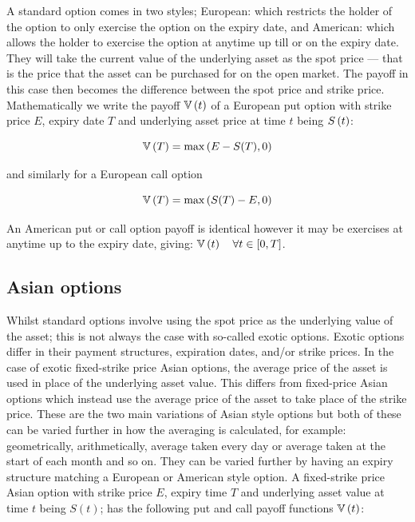 A standard option comes in two styles; European: which restricts the holder of the option to only exercise the option on the expiry date, and American: which allows the holder to exercise the option at anytime up till or on the expiry date. They will take the current value of the underlying asset as the spot price --- that is the price that the asset can be purchased for on the open market. The payoff in this case then becomes the difference between the spot price and strike price.
\nline{}
Mathematically we write the payoff \(\mathbb{V}\left(t\right)\) of a European put option with strike price \(E\), expiry date \(T\) and underlying asset price at time \(t\) being \(S\left(t\right)\):

\begin{equation*}
    \mathbb{V}\left(T\right) = \max\left(E-S(T),0\right) 
\end{equation*}

and similarly for a European call option

\begin{equation*}
    \mathbb{V}\left(T\right) = \max\left(S(T)-E,0\right)
\end{equation*}

An American put or call option payoff is identical however it may be exercises at anytime up to the expiry date, giving: \(\mathbb{V}\left(t\right) \quad \forall t \in [0,T]\).

\subsection{Asian options}

Whilst standard options involve using the spot price as the underlying value of the asset; this is not always the case with so-called exotic options. Exotic options differ in their payment structures, expiration dates, and/or strike prices. In the case of exotic fixed-strike price Asian options, the average price of the asset is used in place of the underlying asset value. This differs from fixed-price Asian options which instead use the average price of the asset to take place of the strike price. These are the two main variations of Asian style options but both of these can be varied further in how the averaging is calculated, for example: geometrically, arithmetically, average taken every day or average taken at the start of each month and so on. They can be varied further by having an expiry structure matching a European or American style option.
\nline{}
A fixed-strike price Asian option with strike price \(E \), expiry time \(T \) and underlying asset value at time \(t\) being \(S(t)\); has the following put and call payoff functions \(\mathbb{V}\left(t\right)\):

